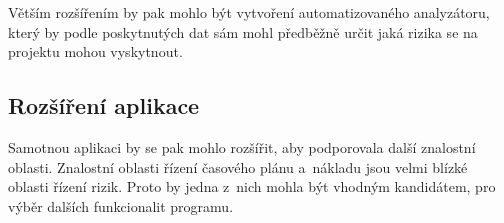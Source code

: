 Větším rozšířením by pak mohlo být vytvoření automatizovaného analyzátoru, který by podle poskytnutých dat sám mohl předběžně určit jaká rizika se na projektu mohou vyskytnout.

\subsection*{Rozšíření aplikace}

Samotnou aplikaci by se pak mohlo rozšířit, aby podporovala další znalostní oblasti. Znalostní oblasti řízení časového plánu a~nákladu jsou velmi blízké oblasti řízení rizik. Proto by jedna z~nich mohla být vhodným kandidátem, pro výběr dalších funkcionalit programu. 


